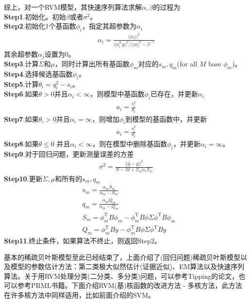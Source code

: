         \par
        综上，对一个RVM模型，其快速序列算法求解$\alpha,\beta$的过程为\\
        \textbf{Step1}.初始化。初始$\beta$或者$\sigma^2$。\\
        \textbf{Step2}.初始化1个基函数$\phi_i$，指定其超参数为$\alpha_i$
        \begin{align*}
        \alpha_i = \frac{||\phi_i||^2}{||\phi_i^\mathrm{T}y||^2/||\phi||^2 - \beta^{-1}}
        \end{align*}
        其余超参数$\alpha_j$设置为0。\\
        \textbf{Step3}.计算$\Sigma$和$\mu$，同时计算出所有基函数$\phi_m$对应的$s_m,q_m$(for all $M$ base $\phi_m$)。\\
        \textbf{Step4}.选择候选基函数$\phi_i$。\\
        \textbf{Step5}.计算$\theta_i = q_i^2 - s_i$。\\
        \textbf{Step6}.如果$\theta >0$并且$\alpha_i<\infty$，则模型中基函数$\phi_i$已存在，并更新$\alpha_i$
        \begin{align*}
        a_i = \frac{s_i^2}{\theta_i}
        \end{align*}
        \textbf{Step7}.如果$\theta_i>0$并且$\alpha_i = \infty$，则增加$\phi_i$到模型的基函数中，并更新
        \begin{align*}
        a_i = \frac{s_i^2}{\theta_i}
        \end{align*}
        \textbf{Step8}.如果$\theta \leqslant 0$ 并且$\alpha_i <\infty$，则在模型中删除基函数$\phi_i$，并更新$\alpha_i = \infty$。\\
        \textbf{Step9}.对于回归问题，更新测量误差的方差
        \begin{align*}
        \sigma^2 = \frac{||\hat{y}- y||^2}{N - M + \Sigma_{ii}\alpha_i \Sigma_{ii}}
        \end{align*}
        \textbf{Step10}.更新$\Sigma,\mu$和所有的$s_m,q_m$
        \begin{align*}
        &s_m = \frac{\alpha_m S_m}{\alpha_m - S_m} \\
        &q_m = \frac{\alpha_m Q_m}{\alpha_m - Q_m} \\
        &S_m = \phi_m^\mathrm{T} B\phi_m - \phi _m^\mathrm{T}B\phi \Sigma \phi^\mathrm{T}B\phi_m\\
        &Q_m = \phi_m^\mathrm{T} By - \phi _m^\mathrm{T}B\phi \Sigma \phi^\mathrm{T}By
        \end{align*}
        \textbf{Step11}.终止条件，如果算法不终止，则返回Step2。
        \par
        基本的稀疏贝叶斯模型至此已经结束了，上面介绍了(回归问题)稀疏贝叶斯模型以及模型的参数估计方法：第二类极大似然估计(证据近似)、EM算法以及快速序列算法。关于用RVM处理分类(二分类、多分类)问题，可以参考Tipping的论文，也可以参考PRML书籍。下面介绍RVM(基)核函数的改进方法 - 多核方法，此方法在许多核方法中同样适用，比如前面介绍的SVM。
